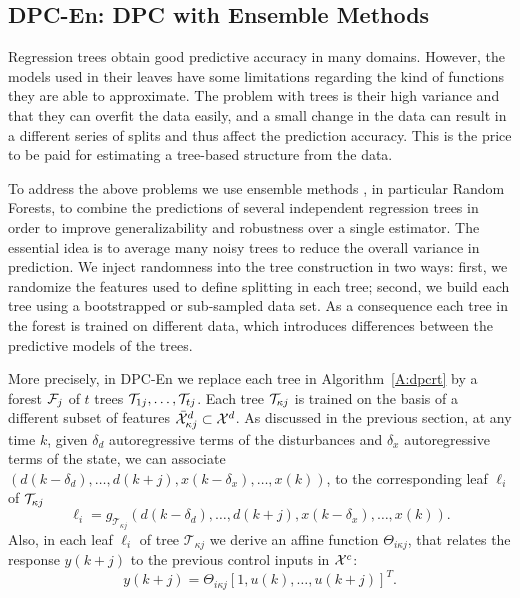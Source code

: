 \subsection{DPC-En: DPC with Ensemble Methods}

\label{SS:dpcrf}

\textcolor[rgb]{0,0,1}{Regression trees obtain good predictive accuracy in many domains. However, the models used in their leaves have some limitations regarding the kind of functions they are able to approximate. The problem with trees is their high variance and that they can overfit the data easily, and a small change in the data can result in a different series of splits and thus affect the prediction accuracy. This is the price to be paid for estimating a tree-based structure from the data.}

\textcolor[rgb]{0,0,1}{To address the above problems we use ensemble methods \cite{Friedman2001}, in particular Random Forests, to combine the predictions of several independent regression trees in order to improve generalizability and robustness over a single estimator. The essential idea is to average many noisy trees to reduce the overall variance in prediction. We inject randomness into the tree construction in two ways: first, we randomize the features used to define splitting in each tree; second, we build each tree using a bootstrapped or sub-sampled data set. As a consequence each tree in the forest is trained on different data, which introduces differences between the predictive models of the trees.}

\textcolor[rgb]{0,0,1}{More precisely, in DPC-En we replace each tree in Algorithm~\ref{A:dpcrt} by a forest $\mathcal{F}_j$ of $t$ trees $\mathcal{T}_{1j},\ldots,\mathcal{T}_{tj}$. Each tree $\mathcal{T}_{\kappa j}$ is trained on the basis of a different subset of features $\bar{\mathcal{X}}^d_{\kappa j} \subset \mathcal{X}^d$. As discussed in the previous section, at any time $k$, given $\delta_d$ autoregressive terms of the disturbances and $\delta_x$ autoregressive terms of the state, we can associate $( d(k-\delta_d),\ldots,d(k+j),x(k-\delta_x),\ldots,x(k) )$, to the corresponding leaf $\ell_i$ of $\mathcal{T}_{\kappa j}$
\begin{equation}\label{E:model_forest}
	\ell_i = \mathit{g}_{\mathcal{T}_{\kappa j}} \left( d(k-\delta_d),\ldots,d(k+j),x(k-\delta_x),\ldots,x(k)  \right).
\end{equation}
Also, in each leaf $\ell_i$ of tree $\mathcal{T}_{\kappa j}$ we derive an affine function $\Theta_{i \kappa j}$, that relates the response $y(k+j)$ to the previous control inputs in $\mathcal{X}^c$:
\begin{equation}\label{E:model_leaf_forest}
	y(k+j) =  \Theta_{i \kappa j} [1,u(k),\ldots,u(k+j) ]^T.
\end{equation}
}

